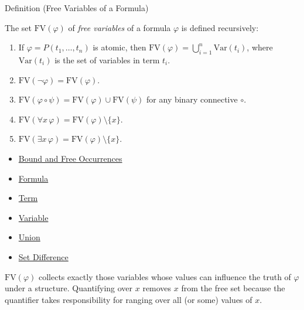 \begin{definitionbox}{Definition (Free Variables of a Formula)}
\begin{definition}\label{def:fv}
The set $\mathrm{FV}(\varphi)$ of \emph{free variables} of a formula $\varphi$
is defined recursively:
\begin{enumerate}
  \item If $\varphi = P(t_1,\dots,t_n)$ is atomic, then
  $\mathrm{FV}(\varphi) = \bigcup_{i=1}^n \mathrm{Var}(t_i)$,
  where $\mathrm{Var}(t_i)$ is the set of variables in term $t_i$.

  \item $\mathrm{FV}(\neg \varphi) = \mathrm{FV}(\varphi)$.

  \item $\mathrm{FV}(\varphi \circ \psi) = \mathrm{FV}(\varphi) \cup \mathrm{FV}(\psi)$
  for any binary connective $\circ$.

  \item $\mathrm{FV}(\forall x\,\varphi) = \mathrm{FV}(\varphi) \setminus \{x\}$.

  \item $\mathrm{FV}(\exists x\,\varphi) = \mathrm{FV}(\varphi) \setminus \{x\}$.
\end{enumerate}
\end{definition}
\end{definitionbox}

\begin{dependencies}
\begin{itemize}
  \item \hyperref[def:bound-free]{Bound and Free Occurrences}
  \item \hyperref[def:formula]{Formula}
  \item \hyperref[def:term]{Term}
  \item \hyperref[def:variable]{Variable}
  \item \hyperref[def:union]{Union}
  \item \hyperref[def:set-difference]{Set Difference}
\end{itemize}
\end{dependencies}

\begin{remark*}
$\mathrm{FV}(\varphi)$ collects exactly those variables whose values can
influence the truth of $\varphi$ under a structure. Quantifying over $x$
removes $x$ from the free set because the quantifier takes responsibility for
ranging over all (or some) values of $x$.
\end{remark*}

